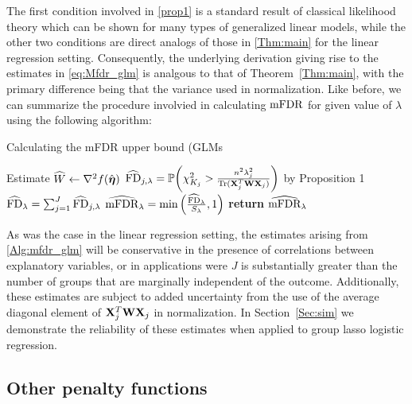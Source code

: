 The first condition involved in \ref{prop1} is a standard result of classical likelihood theory which can be shown for many types of generalized linear models, while the other two conditions are direct analogs of those in \ref{Thm:main} for the linear regression setting.  Consequently, the underlying derivation giving rise to the estimates in \ref{eq:Mfdr_glm} is analgous to that of Theorem~\ref{Thm:main}, with the primary difference being that the variance used in normalization.  Like before, we can summarize the procedure involvied in calculating $\textrm{mFDR}$ for given value of $\lambda$ using the following algorithm:

\begin{algorithm*}
\caption{Calculating the mFDR upper bound (GLMs}\label{Alg:mfdr_glm}
\begin{algorithmic}[10]
\Procedure{}{}
	\State Estimate $\widehat{W} \gets \nabla^2f(\hat{\boldsymbol{\eta}})$
		\State $\widehat{\textrm{FD}}_{j, \lambda} = \mathbb{P} \bigg(\chi^2_{K_j} > \frac{n^2\lambda_j^2}{\operatorname{Tr}(\mathbf{X}_j^T\mathbf{W}\mathbf{X}_j)}\bigg)$ by Proposition 1
	\EndFor
	\State $\widehat{\textrm{FD}}_\lambda =  \sum_{j=1}^{J} \widehat{\textrm{FD}}_{j, \lambda} $
	\State $\widehat{\textrm{mFDR}}_\lambda = \text{min}\left(\frac{\widehat{\textrm{FD}}_\lambda}{S_\lambda}, 1 \right)$
\EndProcedure
\State \textbf{return} $\widehat{\textrm{mFDR}}_\lambda $
\end{algorithmic}
\end{algorithm*}

As was the case in the linear regression setting, the estimates arising from \ref{Alg:mfdr_glm} will be conservative in the presence of correlations between explanatory variables, or in applications were $J$ is substantially greater than the number of groups that are marginally independent of the outcome.  Additionally, these estimates are subject to added uncertainty from the use of the average diagonal element of $\mathbf{X}_j^T\mathbf{W}\mathbf{X}_j$ in normalization.  In Section~\ref{Sec:sim} we demonstrate the reliability of these estimates when applied to group lasso logistic regression.


\subsection{Other penalty functions}

